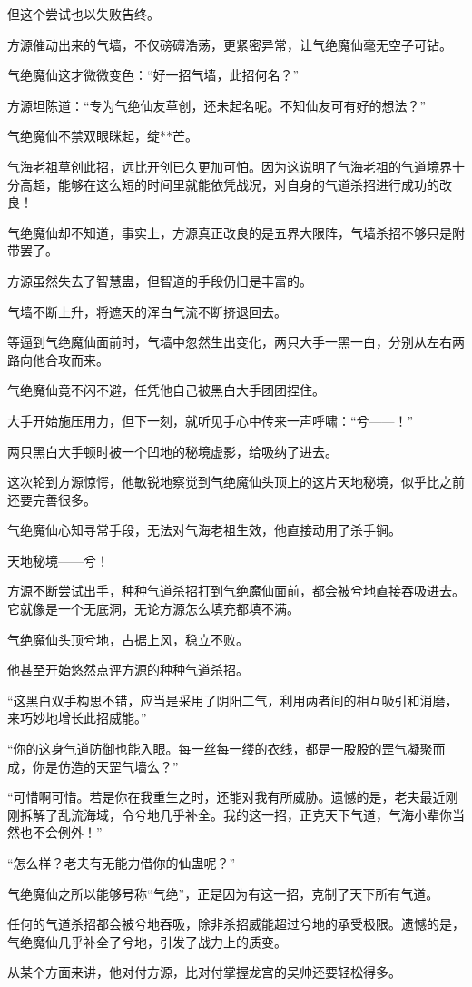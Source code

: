 \begin{this_body}
但这个尝试也以失败告终。

方源催动出来的气墙，不仅磅礴浩荡，更紧密异常，让气绝魔仙毫无空子可钻。

气绝魔仙这才微微变色：“好一招气墙，此招何名？”

方源坦陈道：“专为气绝仙友草创，还未起名呢。不知仙友可有好的想法？”

气绝魔仙不禁双眼眯起，绽**芒。

气海老祖草创此招，远比开创已久更加可怕。因为这说明了气海老祖的气道境界十分高超，能够在这么短的时间里就能依凭战况，对自身的气道杀招进行成功的改良！

气绝魔仙却不知道，事实上，方源真正改良的是五界大限阵，气墙杀招不够只是附带罢了。

方源虽然失去了智慧蛊，但智道的手段仍旧是丰富的。

气墙不断上升，将遮天的浑白气流不断挤退回去。

等逼到气绝魔仙面前时，气墙中忽然生出变化，两只大手一黑一白，分别从左右两路向他合攻而来。

气绝魔仙竟不闪不避，任凭他自己被黑白大手团团捏住。

大手开始施压用力，但下一刻，就听见手心中传来一声呼啸：“兮——！”

两只黑白大手顿时被一个凹地的秘境虚影，给吸纳了进去。

这次轮到方源惊愕，他敏锐地察觉到气绝魔仙头顶上的这片天地秘境，似乎比之前还要完善很多。

气绝魔仙心知寻常手段，无法对气海老祖生效，他直接动用了杀手锏。

天地秘境——兮！

方源不断尝试出手，种种气道杀招打到气绝魔仙面前，都会被兮地直接吞吸进去。它就像是一个无底洞，无论方源怎么填充都填不满。

气绝魔仙头顶兮地，占据上风，稳立不败。

他甚至开始悠然点评方源的种种气道杀招。

“这黑白双手构思不错，应当是采用了阴阳二气，利用两者间的相互吸引和消磨，来巧妙地增长此招威能。”

“你的这身气道防御也能入眼。每一丝每一缕的衣线，都是一股股的罡气凝聚而成，你是仿造的天罡气墙么？”

“可惜啊可惜。若是你在我重生之时，还能对我有所威胁。遗憾的是，老夫最近刚刚拆解了乱流海域，令兮地几乎补全。我的这一招，正克天下气道，气海小辈你当然也不会例外！”

“怎么样？老夫有无能力借你的仙蛊呢？”

气绝魔仙之所以能够号称“气绝”，正是因为有这一招，克制了天下所有气道。

任何的气道杀招都会被兮地吞吸，除非杀招威能超过兮地的承受极限。遗憾的是，气绝魔仙几乎补全了兮地，引发了战力上的质变。

从某个方面来讲，他对付方源，比对付掌握龙宫的吴帅还要轻松得多。

\end{this_body}

